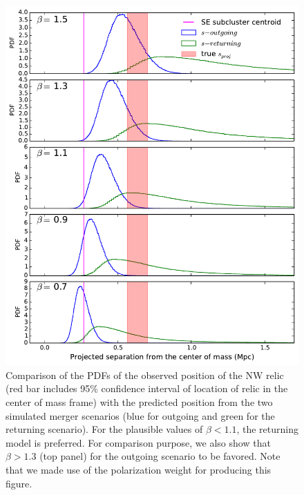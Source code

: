 \documentclass[letterpaper,useAMS,usenatbib]{mn2e}
\begin{document}
\begin{figure}
	\includegraphics[width=\linewidth]{polar_prior_bounds.pdf}
	\caption{Comparison of the PDFs of the observed position of the NW relic (red bar
		includes 95\% confidence interval of location of relic in the center of
		mass frame) with the	predicted position from the two simulated merger scenarios (blue for outgoing and green for the returning scenario). 
	For the plausible values of $\beta  < 1.1$, the returning model is
	preferred. For comparison purpose, we also show that $\beta > 1.3$ (top
	panel) for the outgoing scenario to be favored.  
	Note that we made use of the polarization weight for producing this figure. 
	\label{fig:positionprior}}
\end{figure}
\clearpage
\bsp 
\label{lastpage} 
\end{document}
